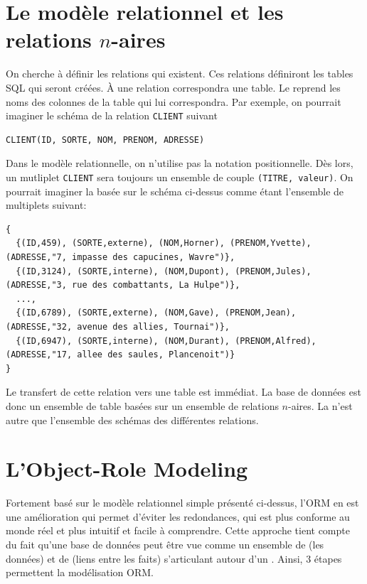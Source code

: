 \section{Le modèle relationnel et les relations $n$-aires}
On cherche à définir les relations qui existent.
Ces relations définiront les tables SQL qui seront créées.
À une relation correspondra une table.
Le  reprend les noms des colonnes de
la table qui lui correspondra.
Par exemple, on pourrait imaginer le schéma de la relation
\lstinline|CLIENT| suivant
\begin{lstlisting}
CLIENT(ID, SORTE, NOM, PRENOM, ADRESSE)
\end{lstlisting}
Dans le modèle relationnelle, on n'utilise pas la notation positionnelle.
Dès lors, un mutliplet \lstinline|CLIENT| sera toujours
un ensemble de couple \lstinline$(TITRE, valeur)$.
On pourrait imaginer la  basée sur
le schéma ci-dessus comme étant l'ensemble de multiplets suivant:
\begin{lstlisting}
{
  {(ID,459), (SORTE,externe), (NOM,Horner), (PRENOM,Yvette), (ADRESSE,"7, impasse des capucines, Wavre")},
  {(ID,3124), (SORTE,interne), (NOM,Dupont), (PRENOM,Jules), (ADRESSE,"3, rue des combattants, La Hulpe")},
  ...,
  {(ID,6789), (SORTE,externe), (NOM,Gave), (PRENOM,Jean), (ADRESSE,"32, avenue des allies, Tournai")},
  {(ID,6947), (SORTE,interne), (NOM,Durant), (PRENOM,Alfred), (ADRESSE,"17, allee des saules, Plancenoit")}
}
\end{lstlisting}
Le transfert de cette relation vers une table est immédiat.
La base de données est donc un ensemble de table basées
sur un ensemble de relations $n$-aires.
La  n'est
autre que l'ensemble des schémas des différentes relations.

\section{L'Object-Role Modeling}
Fortement basé sur le modèle relationnel simple présenté ci-dessus,
l'ORM en est une amélioration qui permet d'éviter les redondances,
qui est plus conforme au monde réel et plus intuitif et facile à comprendre.
Cette approche tient compte du fait qu'une base de données
peut être vue comme un ensemble de  (les données)
et de  (liens entre les faits) s'articulant autour
d'un .
Ainsi, 3 étapes permettent la modélisation ORM.

